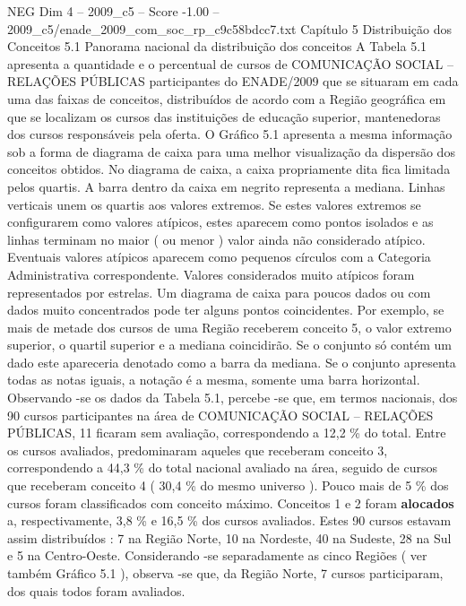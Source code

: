 \begin{textsample}{NEG Dim 4 – 2009\_c5 – Score -1.00 – 2009\_c5/enade\_2009\_com\_soc\_rp\_c9c58bdcc7.txt}  \label{ex:f4_neg_084}
Capítulo 5 Distribuição dos Conceitos 5.1 Panorama nacional da distribuição dos conceitos A Tabela 5.1 apresenta a quantidade e o percentual de cursos de COMUNICAÇÃO SOCIAL – RELAÇÕES PÚBLICAS participantes do ENADE/2009 que se situaram em cada uma das faixas de conceitos, distribuídos de acordo com a Região geográfica em que se localizam os cursos das instituições de educação superior, mantenedoras dos cursos responsáveis pela oferta.
O Gráfico 5.1 apresenta a mesma informação sob a forma de diagrama de caixa para uma melhor visualização da dispersão dos conceitos obtidos.
No diagrama de caixa, a caixa propriamente dita fica limitada pelos quartis.
A barra dentro da caixa em negrito representa a mediana.
Linhas verticais unem os quartis aos valores extremos.
Se estes valores extremos se configurarem como valores atípicos, estes aparecem como pontos isolados e as linhas terminam no maior ( ou menor ) valor ainda não considerado atípico.
Eventuais valores atípicos aparecem como pequenos círculos com a Categoria Administrativa correspondente.
Valores considerados muito atípicos foram representados por estrelas.
Um diagrama de caixa para poucos dados ou com dados muito concentrados pode ter alguns pontos coincidentes.
Por exemplo, se mais de metade dos cursos de uma Região receberem conceito 5, o valor extremo superior, o quartil superior e a mediana coincidirão.
Se o conjunto só contém um dado este apareceria denotado como a barra da mediana.
Se o conjunto apresenta todas as notas iguais, a notação é a mesma, somente uma barra horizontal.
Observando -se os dados da Tabela 5.1, percebe -se que, em termos nacionais, dos 90 cursos participantes na área de COMUNICAÇÃO SOCIAL – RELAÇÕES PÚBLICAS, 11 ficaram sem avaliação, correspondendo a 12,2 \% do total.
Entre os cursos avaliados, predominaram aqueles que receberam conceito 3, correspondendo a 44,3 \% do total nacional avaliado na área, seguido de cursos que receberam conceito 4 ( 30,4 \% do mesmo universo ).
Pouco mais de 5 \% dos cursos foram classificados com conceito máximo.
Conceitos 1 e 2 foram \textbf{alocados} a, respectivamente, 3,8 \% e 16,5 \% dos cursos avaliados.
Estes 90 cursos estavam assim distribuídos : 7 na Região Norte, 10 na Nordeste, 40 na Sudeste, 28 na Sul e 5 na Centro-Oeste.
Considerando -se separadamente as cinco Regiões ( ver também Gráfico 5.1 ), observa -se que, da Região Norte, 7 cursos participaram, dos quais todos foram avaliados.

\end{textsample}
